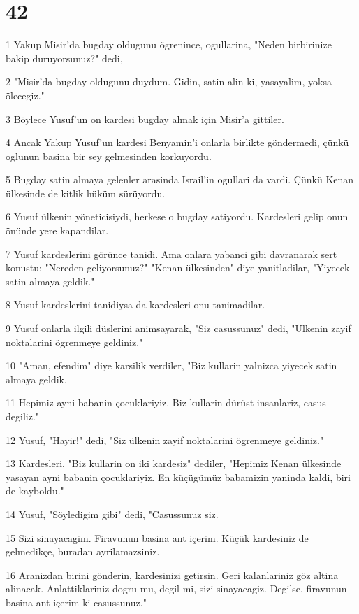 \chapter{42}

\par 1 Yakup Misir'da bugday oldugunu ögrenince, ogullarina, "Neden birbirinize bakip duruyorsunuz?" dedi,
\par 2 "Misir'da bugday oldugunu duydum. Gidin, satin alin ki, yasayalim, yoksa ölecegiz."
\par 3 Böylece Yusuf'un on kardesi bugday almak için Misir'a gittiler.
\par 4 Ancak Yakup Yusuf'un kardesi Benyamin'i onlarla birlikte göndermedi, çünkü oglunun basina bir sey gelmesinden korkuyordu.
\par 5 Bugday satin almaya gelenler arasinda Israil'in ogullari da vardi. Çünkü Kenan ülkesinde de kitlik hüküm sürüyordu.
\par 6 Yusuf ülkenin yöneticisiydi, herkese o bugday satiyordu. Kardesleri gelip onun önünde yere kapandilar.
\par 7 Yusuf kardeslerini görünce tanidi. Ama onlara yabanci gibi davranarak sert konustu: "Nereden geliyorsunuz?" "Kenan ülkesinden" diye yanitladilar, "Yiyecek satin almaya geldik."
\par 8 Yusuf kardeslerini tanidiysa da kardesleri onu tanimadilar.
\par 9 Yusuf onlarla ilgili düslerini animsayarak, "Siz casussunuz" dedi, "Ülkenin zayif noktalarini ögrenmeye geldiniz."
\par 10 "Aman, efendim" diye karsilik verdiler, "Biz kullarin yalnizca yiyecek satin almaya geldik.
\par 11 Hepimiz ayni babanin çocuklariyiz. Biz kullarin dürüst insanlariz, casus degiliz."
\par 12 Yusuf, "Hayir!" dedi, "Siz ülkenin zayif noktalarini ögrenmeye geldiniz."
\par 13 Kardesleri, "Biz kullarin on iki kardesiz" dediler, "Hepimiz Kenan ülkesinde yasayan ayni babanin çocuklariyiz. En küçügümüz babamizin yaninda kaldi, biri de kayboldu."
\par 14 Yusuf, "Söyledigim gibi" dedi, "Casussunuz siz.
\par 15 Sizi sinayacagim. Firavunun basina ant içerim. Küçük kardesiniz de gelmedikçe, buradan ayrilamazsiniz.
\par 16 Aranizdan birini gönderin, kardesinizi getirsin. Geri kalanlariniz göz altina alinacak. Anlattiklariniz dogru mu, degil mi, sizi sinayacagiz. Degilse, firavunun basina ant içerim ki casussunuz."
